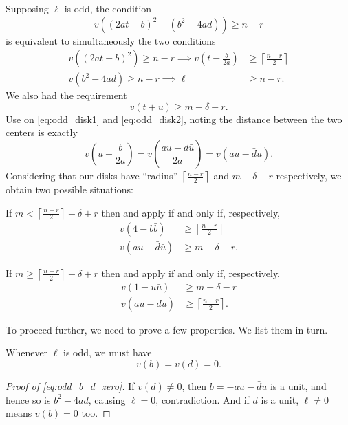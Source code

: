 Supposing $\ell$ is odd, the condition
\[ v\left( (2at-b)^2 - (b^2-4a\bar d) \right) \geq n-r \]
is equivalent to simultaneously the two conditions
\begin{align}
  v\left( (2at-b)^2 \right) \geq n-r
  \implies v\left( t-\frac{b}{2a} \right) &\geq \left\lceil \frac{n-r}{2} \right\rceil
  \label{eq:odd_disk1} \\
  v(b^2-4a\bar d) \ge n-r \implies \ell &\ge n-r. \label{eq:odd_n_bound}
\end{align}
We also had the requirement
\begin{equation}
  v(t+u) \ge m-\delta-r.
  \label{eq:odd_disk2}
\end{equation}
Use  on \eqref{eq:odd_disk1} and \eqref{eq:odd_disk2},
noting the distance between the two centers is exactly
\[ v\left( u + \frac{b}{2a} \right) = v\left( \frac{au-\bar d \bar u}{2a} \right)
  = v(au - \bar d \bar u). \]
Considering that our disks have ``radius''
$\left\lceil \frac{n-r}{2} \right\rceil$ and $m-\delta-r$ respectively,
we obtain two possible situations:
\begin{itemize}
  \ii If $m < \left\lceil \frac{n-r}{2} \right\rceil + \delta + r$
  then  and  apply if and only if, respectively,
  \begin{align}
    v(4-b\bar b) &\ge \left\lceil \frac{n-r}{2} \right\rceil \label{eq:odd_ineq1} \\
    v(au - \bar d \bar u) &\ge m - \delta - r \label{eq:odd_ineq2}.
  \end{align}

  \ii If $m \geq \left\lceil \frac{n-r}{2} \right\rceil + \delta + r$
  then  and  apply if and only if, respectively,
  \begin{align}
    v(1-u \bar u) &\ge m-\delta-r \label{eq:odd_ineq3} \\
    v(au - \bar d \bar u) &\ge \left\lceil \frac{n-r}{2} \right\rceil \label{eq:odd_ineq4}.
  \end{align}
\end{itemize}
To proceed further, we need to prove a few properties.
We list them in turn.

\begin{fact}
  Whenever $\ell$ is odd, we must have
  \begin{equation}
    v(b) = v(d) = 0.
    \label{eq:odd_b_d_zero}
  \end{equation}
\end{fact}
\begin{proof}
  [Proof of \eqref{eq:odd_b_d_zero}]
  If $v(d) \neq 0$, then $b = -au-\bar d\bar u$ is a unit,
  and hence so is $b^2 - 4 a \bar d$, causing $\ell = 0$, contradiction.
  And if $d$ is a unit, $\ell \neq 0$ means $v(b) = 0$ too.
\end{proof}

